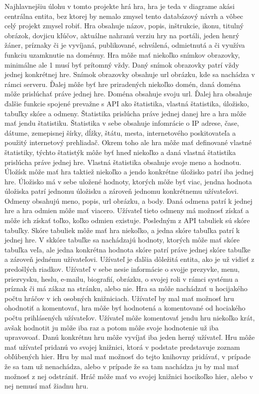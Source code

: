 Najhlavnejšiu úlohu v tomto projekte hrá hra, hra je teda v diagrame akási centrálna entita, bez ktorej by nemalo zmysel tento databázový návrh a vôbec celý projekt zmysel robiť. Hra obsahuje názov, popis, inštrukcie, ikonu, titulný obrázok, dovjicu kľúčov, aktuálne nahranú verziu hry na portáli, jeden henrý žáner, príznaky či je vyvíjaná, publikované, schválená, odmietnutá a či využíva funkciu uzamknutie na doménuy. Hra môže mať niekoľko snímkov obrazovky, minimálne ale 1 musí byť prítomný vždy. Daný snímok obrazovky patrí vždy jednej konkrétnej hre. Snímok obrazovky obsahuje url obrázku, kde sa nachádza v rámci serveru. Ďalej môže byť hre priradených niekoľko domén, daná doména môže prislúchať práve jednej hre. Doména obsahuje svoju url. Ďalej hra obsahuje ďalšie funkcie spojené prevažne s API ako štatistika, vlastná štatistika, úložisko, tabuľky skóre a odmeny. Štatistika prislúcha práve jednej danej hre a hra môže mať jendu štatistiku. Štatistika v sebe obsahuje infomrácie o IP adrese, čase, dátume, zemepisnej šírky, dĺžky, štátu, mesta, internetového poskitovateľa a použitý internetový prehliadač. Okrem toho ale hra môže mať definované vlastné štatistiky, týchto štatistýk môže byť hneď niekoľko a daná vlastná štatistika prislúcha práve jednej hre. Vlastná štatistika obsahuje svoje meno a hodnotu. Úložísk môže mať hra taktiež niekoľko a jendo konkrétne úložisko patrí iba jednej hre. Úložisko má v sebe uložené hodnoty, ktorých môže byť viac, jendna hodnota úložiska patrí jednomu úložisku a zároveň jednomu konkrétnemu užívateľovi. Odmeny obsahujú meno, popis, url obrázku, a body. Daná odmena patrí k jednej hre a hra odmien môže mať viacero. Užívateľ tieto odmeny má možnosť získať a môže ich získať toľko, koľko odmien existuje. Posledným z API tabuliek sú skóre tabuľky. Skóre tabuliek môže mať hra niekoľko, a jedna skóre tabuľka patrí k jednej hre. V skkóre tabuľke sa nachádzajú hodnoty, ktorých môže mať skóre tabuľka veľa, ale jedna konkrétna hodnota skóre patrí práve jednej skóre tabuľke a zároveň jednému užívateľovi. Užívateľ je ďalšia dôležitá entita, ako je už vidieť z predošlých riadkov. Užívateľ v sebe nesie informácie o svojje prezyvke, menu, priezvysku, heslu, e-mailu, biografií, obrázku, o svojej roli v rámci systému a príznak či má zákaz na stránku, alebo nie. Hra sa môže nachádzať u hocijakého počtu hráčov v ich osobných knižniciach. Užívateľ by mal mať možnosť hru ohodnotiť a komentovať, hra môže byť hodnotená a komentované od hociakého počtu prihlásených užívateľov. Užívateľ môže komentovať jendu hru niekoľko krát, avšak hodnotit ju môže iba raz a potom môže svoje hodnotenie už iba upravovoať. Danú konkrétnu hru môže vyvíjať iba jeden herný užívateľ. Hru môže mať užívateľ pridanú vo svojej knižnici, ktorá v podstate predstavuje zoznam obľúbených hier. Hru by mal mať možnosť do tejto knihovny pridávať, v prípade  že sa tam už nenachádza, alebo v prípade že sa tam nachádza ju by mal mať možnosť z nej odstrániť. Hráč môže mať vo svojej knižnici hocikoľko hier, alebo v nej nemusí mať žiadnu hru.

